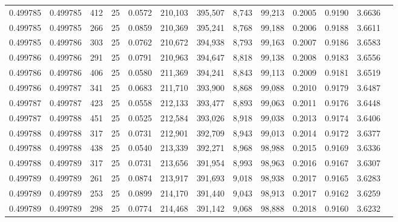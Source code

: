 \begin{tabular}{rrrrrrrrrrrrr}
0.499785 & 0.499785 &   412 &  25 &                                     0.0572 & 210,103 & 395,507 &   8,743 &  99,213 & 0.2005 & 0.9190 & 3.6636 \\
0.499785 & 0.499785 &   266 &  25 &                                     0.0859 & 210,369 & 395,241 &   8,768 &  99,188 & 0.2006 & 0.9188 & 3.6611 \\
0.499785 & 0.499786 &   303 &  25 &                                     0.0762 & 210,672 & 394,938 &   8,793 &  99,163 & 0.2007 & 0.9186 & 3.6583 \\
0.499786 & 0.499786 &   291 &  25 &                                     0.0791 & 210,963 & 394,647 &   8,818 &  99,138 & 0.2008 & 0.9183 & 3.6556 \\
0.499786 & 0.499786 &   406 &  25 &                                     0.0580 & 211,369 & 394,241 &   8,843 &  99,113 & 0.2009 & 0.9181 & 3.6519 \\
0.499786 & 0.499787 &   341 &  25 &                                     0.0683 & 211,710 & 393,900 &   8,868 &  99,088 & 0.2010 & 0.9179 & 3.6487 \\
0.499787 & 0.499787 &   423 &  25 &                                     0.0558 & 212,133 & 393,477 &   8,893 &  99,063 & 0.2011 & 0.9176 & 3.6448 \\
0.499787 & 0.499788 &   451 &  25 &                                     0.0525 & 212,584 & 393,026 &   8,918 &  99,038 & 0.2013 & 0.9174 & 3.6406 \\
0.499788 & 0.499788 &   317 &  25 &                                     0.0731 & 212,901 & 392,709 &   8,943 &  99,013 & 0.2014 & 0.9172 & 3.6377 \\
0.499788 & 0.499788 &   438 &  25 &                                     0.0540 & 213,339 & 392,271 &   8,968 &  98,988 & 0.2015 & 0.9169 & 3.6336 \\
0.499788 & 0.499789 &   317 &  25 &                                     0.0731 & 213,656 & 391,954 &   8,993 &  98,963 & 0.2016 & 0.9167 & 3.6307 \\
0.499789 & 0.499789 &   261 &  25 &                                     0.0874 & 213,917 & 391,693 &   9,018 &  98,938 & 0.2017 & 0.9165 & 3.6283 \\
0.499789 & 0.499789 &   253 &  25 &                                     0.0899 & 214,170 & 391,440 &   9,043 &  98,913 & 0.2017 & 0.9162 & 3.6259 \\
0.499789 & 0.499789 &   298 &  25 &                                     0.0774 & 214,468 & 391,142 &   9,068 &  98,888 & 0.2018 & 0.9160 & 3.6232 \\

\end{tabular}
